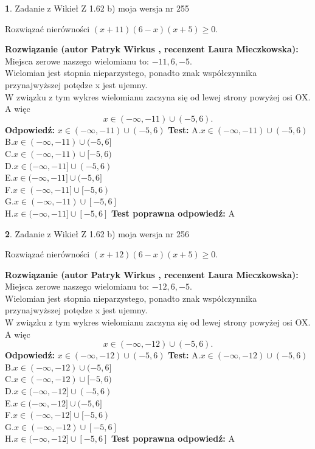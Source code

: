 \documentclass[12pt, a4paper]{article}
\theoremstyle{definition} %
\newtheorem{zad}{}
\newcommand{\zadStart}[1]{\begin{zad}#1\newline}
\newcommand{\zadStop}{\end{zad}}
\newcommand{\rozwStart}[2]{\noindent \textbf{Rozwiązanie (autor #1 , recenzent #2): }\newline}
\newcommand{\rozwStop}{\newline}
\newcommand{\odpStart}{\noindent \textbf{Odpowiedź:}\newline}
\newcommand{\odpStop}{\newline}
\newcommand{\testStart}{\noindent \textbf{Test:}\newline}
\newcommand{\testStop}{\newline}
\newcommand{\kluczStart}{\noindent \textbf{Test poprawna odpowiedź:}\newline}
\newcommand{\kluczStop}{\newline}
\begin{document}
\zadStart{Zadanie z Wikieł Z 1.62 b) moja wersja nr 255}

Rozwiązać nierówności $(x+11)(6-x)(x+5)\ge0$.
\zadStop
\rozwStart{Patryk Wirkus}{Laura Mieczkowska}
Miejsca zerowe naszego wielomianu to: $-11, 6, -5$.\\
Wielomian jest stopnia nieparzystego, ponadto znak współczynnika przy\linebreak najwyższej potędze x jest ujemny.\\ W związku z tym wykres wielomianu zaczyna się od lewej strony powyżej osi OX. A więc $$x \in (-\infty,-11) \cup (-5,6).$$
\rozwStop
\odpStart
$x \in (-\infty,-11) \cup (-5,6)$
\odpStop
\testStart
A.$x \in (-\infty,-11) \cup (-5,6)$\\
B.$x \in (-\infty,-11) \cup (-5,6]$\\
C.$x \in (-\infty,-11) \cup [-5,6)$\\
D.$x \in (-\infty,-11] \cup (-5,6)$\\
E.$x \in (-\infty,-11] \cup (-5,6]$\\
F.$x \in (-\infty,-11] \cup [-5,6)$\\
G.$x \in (-\infty,-11) \cup [-5,6]$\\
H.$x \in (-\infty,-11] \cup [-5,6]$
\testStop
\kluczStart
A
\kluczStop



\zadStart{Zadanie z Wikieł Z 1.62 b) moja wersja nr 256}

Rozwiązać nierówności $(x+12)(6-x)(x+5)\ge0$.
\zadStop
\rozwStart{Patryk Wirkus}{Laura Mieczkowska}
Miejsca zerowe naszego wielomianu to: $-12, 6, -5$.\\
Wielomian jest stopnia nieparzystego, ponadto znak współczynnika przy\linebreak najwyższej potędze x jest ujemny.\\ W związku z tym wykres wielomianu zaczyna się od lewej strony powyżej osi OX. A więc $$x \in (-\infty,-12) \cup (-5,6).$$
\rozwStop
\odpStart
$x \in (-\infty,-12) \cup (-5,6)$
\odpStop
\testStart
A.$x \in (-\infty,-12) \cup (-5,6)$\\
B.$x \in (-\infty,-12) \cup (-5,6]$\\
C.$x \in (-\infty,-12) \cup [-5,6)$\\
D.$x \in (-\infty,-12] \cup (-5,6)$\\
E.$x \in (-\infty,-12] \cup (-5,6]$\\
F.$x \in (-\infty,-12] \cup [-5,6)$\\
G.$x \in (-\infty,-12) \cup [-5,6]$\\
H.$x \in (-\infty,-12] \cup [-5,6]$
\testStop
\kluczStart
A
\kluczStop
\end{document}
